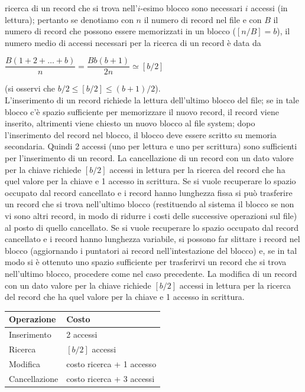 ricerca di un record che si trova nell'$i$-esimo blocco sono necessari $i$ accessi (in lettura); 
pertanto se denotiamo con $n$ il numero di record nel file e con $B$ il numero di record che possono 
essere memorizzati in un blocco ($[n/B]=b$), il numero medio di accessi necessari per la ricerca di un 
record è data da
\begin{center}
$\dfrac{B(1+2+\ldots +b)}{n} = \dfrac{Bb(b+1)}{2n} \simeq [b/2]$ 
\end{center}
(si osservi che $b/2\leq[b/2] \leq (b+1)/2$).\\
L'inserimento di un record richiede la lettura dell'ultimo blocco del file; se in tale blocco c'è spazio
sufficiente per memorizzare il nuovo record, il record viene inserito, altrimenti viene chiesto un
nuovo blocco al file system; dopo l'inserimento del record nel blocco, il blocco deve essere scritto
su memoria secondaria. Quindi 2 accessi (uno per lettura e uno per scrittura) sono sufficienti per
l'inserimento di un record. La cancellazione di un record con un dato valore per la chiave richiede
$[b/2]$ accessi in lettura per la ricerca del record che ha quel valore per la chiave e 1 accesso in
scrittura. Se si vuole recuperare lo spazio occupato dal record cancellato e i record hanno lunghezza
fissa si può trasferire un record che si trova nell'ultimo blocco (restituendo al sistema il blocco se
non vi sono altri record, in modo di ridurre i costi delle successive operazioni sul file) al posto di
quello cancellato. Se si vuole recuperare lo spazio occupato dal record cancellato e i record hanno
lunghezza variabile, si possono far slittare i record nel blocco (aggiornando i puntatori ai record
nell'intestazione del blocco) e, se in tal modo si è ottenuto uno spazio sufficiente per trasferirvi un
record che si trova nell'ultimo blocco, procedere come nel caso precedente. La modifica di un
record con un dato valore per la chiave richiede $[b/2]$ accessi in lettura per la ricerca del record che
ha quel valore per la chiave e 1 accesso in scrittura.\\
\begin{center}
 \begin{tabular}{l|l}
  \textbf{Operazione} & \textbf{Costo}\\
  \hline
  Inserimento & 2 accessi\\
  Ricerca & $[b/2]$ accessi\\
  Modifica & costo ricerca + 1 accesso\\
  Cancellazione & costo ricerca + 3 accessi\\
 \end{tabular}
\end{center}

